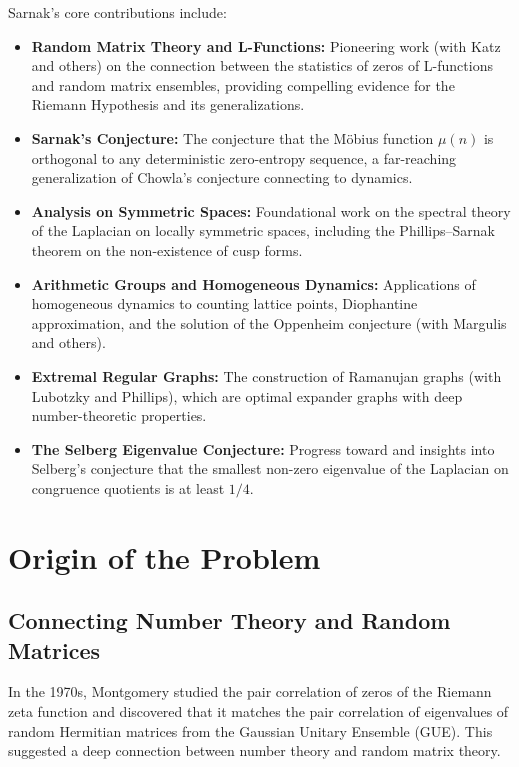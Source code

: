 Sarnak's core contributions include:
\begin{itemize}
    \item \textbf{Random Matrix Theory and L-Functions:} Pioneering work (with Katz and others) on the connection between the statistics of zeros of L-functions and random matrix ensembles, providing compelling evidence for the Riemann Hypothesis and its generalizations.
    \item \textbf{Sarnak's Conjecture:} The conjecture that the M\"obius function $\mu(n)$ is orthogonal to any deterministic zero-entropy sequence, a far-reaching generalization of Chowla's conjecture connecting to dynamics.
    \item \textbf{Analysis on Symmetric Spaces:} Foundational work on the spectral theory of the Laplacian on locally symmetric spaces, including the Phillips--Sarnak theorem on the non-existence of cusp forms.
    \item \textbf{Arithmetic Groups and Homogeneous Dynamics:} Applications of homogeneous dynamics to counting lattice points, Diophantine approximation, and the solution of the Oppenheim conjecture (with Margulis and others).
    \item \textbf{Extremal Regular Graphs:} The construction of Ramanujan graphs (with Lubotzky and Phillips), which are optimal expander graphs with deep number-theoretic properties.
    \item \textbf{The Selberg Eigenvalue Conjecture:} Progress toward and insights into Selberg's conjecture that the smallest non-zero eigenvalue of the Laplacian on congruence quotients is at least $1/4$.
\end{itemize}

\section{Origin of the Problem}

\subsection{Connecting Number Theory and Random Matrices}

In the 1970s, Montgomery studied the pair correlation of zeros of the Riemann zeta function and discovered that it matches the pair correlation of eigenvalues of random Hermitian matrices from the Gaussian Unitary Ensemble (GUE). This suggested a deep connection between number theory and random matrix theory.

